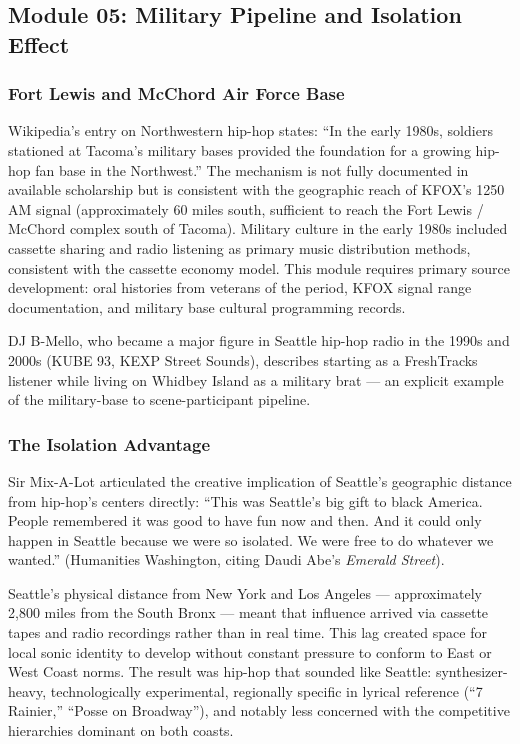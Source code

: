 \documentclass[11pt,letterpaper]{article}
\begin{document}
\subsection{Module 05: Military Pipeline and Isolation Effect}

\subsubsection{Fort Lewis and McChord Air Force Base}

Wikipedia's entry on Northwestern hip-hop states: ``In the early 1980s, soldiers stationed at Tacoma's military bases provided the foundation for a growing hip-hop fan base in the Northwest.'' The mechanism is not fully documented in available scholarship but is consistent with the geographic reach of KFOX's 1250 AM signal (approximately 60 miles south, sufficient to reach the Fort Lewis / McChord complex south of Tacoma). Military culture in the early 1980s included cassette sharing and radio listening as primary music distribution methods, consistent with the cassette economy model. This module requires primary source development: oral histories from veterans of the period, KFOX signal range documentation, and military base cultural programming records.

DJ B-Mello, who became a major figure in Seattle hip-hop radio in the 1990s and 2000s (KUBE 93, KEXP Street Sounds), describes starting as a FreshTracks listener while living on Whidbey Island as a military brat --- an explicit example of the military-base to scene-participant pipeline.

\subsubsection{The Isolation Advantage}

Sir Mix-A-Lot articulated the creative implication of Seattle's geographic distance from hip-hop's centers directly: ``This was Seattle's big gift to black America. People remembered it was good to have fun now and then. And it could only happen in Seattle because we were so isolated. We were free to do whatever we wanted.'' (Humanities Washington, citing Daudi Abe's \textit{Emerald Street}).

Seattle's physical distance from New York and Los Angeles --- approximately 2,800 miles from the South Bronx --- meant that influence arrived via cassette tapes and radio recordings rather than in real time. This lag created space for local sonic identity to develop without constant pressure to conform to East or West Coast norms. The result was hip-hop that sounded like Seattle: synthesizer-heavy, technologically experimental, regionally specific in lyrical reference (``7 Rainier,'' ``Posse on Broadway''), and notably less concerned with the competitive hierarchies dominant on both coasts.
\end{document}
